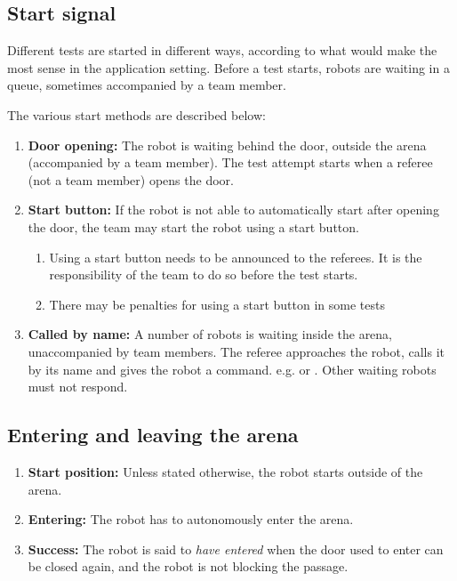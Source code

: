 \subsection{Start signal}
\label{rule:start_signal}

Different tests are started in different ways, according to what would make the most sense in the application setting. 
Before a test starts, robots are waiting in a queue, sometimes accompanied by a team member. 

The various start methods are described below:
\begin{enumerate}
	\item \textbf{Door opening:} The robot is waiting behind the door, outside the arena (accompanied by a team member). The test attempt starts when a referee (not a team member) opens the door. 
	\item \textbf{Start button:} If the robot is not able to automatically start after opening the door, the team may start the robot using a start button. 
	\begin{enumerate}
		\item Using a start button needs to be announced to the referees. It is the responsibility of the team to do so before the test starts.
		\item There may be penalties for using a start button in some tests
	\end{enumerate}
    \item \textbf{Called by name:} A number of robots is waiting inside the arena, unaccompanied by team members. 
				      The referee approaches the robot, calls it by its name and gives the robot a command. e.g.  or .
				      Other waiting robots must not respond. 
\end{enumerate}


\subsection{Entering and leaving the arena}
\label{rule:start_position}
\begin{enumerate}
	\item \textbf{Start position:} Unless stated otherwise, the robot starts outside of the arena.
	\item \textbf{Entering:} The robot has to autonomously enter the arena.
	\item \textbf{Success:} The robot is said to \emph{have entered} when the door used to enter can be closed again, and the robot is not blocking the passage.
\end{enumerate}



